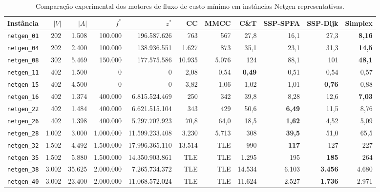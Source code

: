 \begin{table}[!ht]
\centering
\small
\setlength{\tabcolsep}{3.5pt}
\begin{tabular}{lrrrrrrrrrr}
\toprule
\textbf{Instância} & $|V|$ & $|A|$ & $f^*$ & $z^*$ & \textbf{CC} & \textbf{MMCC} & \textbf{C\&T} & \textbf{SSP-SPFA} & \textbf{SSP-Dijk} & \textbf{Simplex} \\
\midrule
\texttt{netgen\_01} & 202 & 1.508 & 100.000 & 196.587.626 & 763 & 567 & 27,8 & 16,1 & 27,3 & \textbf{8,16} \\
\texttt{netgen\_04} & 202 & 2.400 & 100.000 & 138.936.551 & 1.627 & 873 & 35,1 & 23,1 & 31,3 & \textbf{14,5} \\
\texttt{netgen\_08} & 302 & 5.469 & 150.000 & 177.575.586 & 10.935 & 5.076 & 124 & 88,1 & 101 & \textbf{48,1} \\
\texttt{netgen\_11} & 402 & 1.500 & 0 & 0 & 2,08 & 0,54 & \textbf{0,49} & 0,51 & 0,54 & 0,57 \\
\texttt{netgen\_15} & 402 & 4.500 & 0 & 0 & 3,82 & 1,06 & 1,02 & 1,01 & \textbf{0,76} & 0,88 \\
\texttt{netgen\_16} & 402 & 1.374 & 400.000 & 6.815.524.469 & 250 & 342 & 39,8 & 8,28 & 12,6 & \textbf{7,03} \\
\texttt{netgen\_22} & 402 & 1.484 & 400.000 & 6.621.515.104 & 343 & 429 & 50,6 & \textbf{6,49} & 11,5 & 8,76 \\
\texttt{netgen\_26} & 402 & 1.398 & 400.000 & 5.297.702.923 & 70,8 & 64,0 & 18,5 & \textbf{1,62} & 4,52 & 5,09 \\
\texttt{netgen\_28} & 1.002 & 3.000 & 1.000.000 & 11.599.233.408 & 3.230 & 5.713 & 308 & \textbf{39,5} & 51,0 & 65,5 \\
\texttt{netgen\_32} & 1.502 & 4.492 & 1.500.000 & 17.996.365.110 & 13.514 & TLE & 990 & \textbf{117} & 127 & 227 \\
\texttt{netgen\_35} & 1.502 & 5.880 & 1.500.000 & 14.350.903.861 & TLE & TLE & 1.295 & 195 & \textbf{185} & 264 \\
\texttt{netgen\_38} & 3.002 & 35.625 & 2.000.000 & 7.265.734.372 & TLE & TLE & 14.534 & 6.103 & \textbf{3.456} & 4.680 \\
\texttt{netgen\_40} & 3.002 & 23.400 & 2.000.000 & 11.068.572.024 & TLE & TLE & 11.624 & 2.527 & \textbf{1.736} & 2.971 \\
\bottomrule
\end{tabular}
\caption{Comparação experimental dos motores de fluxo de custo mínimo em instâncias Netgen representativas.}
\label{tab:benchmarks_mincost}
\end{table}
